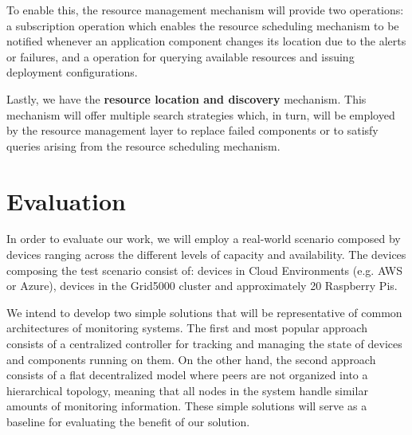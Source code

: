 
To enable this, the resource management mechanism will provide two operations: a subscription operation which enables the resource scheduling mechanism to be notified whenever an application component changes its location due to the alerts or failures, and a operation for querying available resources and issuing deployment configurations. 

Lastly, we have the \textbf{resource location and discovery} mechanism. This mechanism will offer multiple search strategies which, in turn, will be employed by the resource management layer to replace failed components or to satisfy queries arising from the resource scheduling mechanism.

\section{Evaluation}  

In order to evaluate our work, we will employ a real-world scenario composed by devices ranging across the different levels of capacity and availability. The devices composing the test scenario consist of: devices in Cloud Environments (e.g. AWS or Azure), devices in the Grid5000 cluster and approximately 20 Raspberry Pis.

We intend to develop two simple solutions 
that will be representative of common architectures of monitoring systems. The first and most popular approach consists of a centralized controller for tracking and managing the state of devices and components running on them. %
On the other hand, the second approach consists of a flat decentralized model where peers are not organized into a hierarchical topology, 
meaning that all nodes in the system handle similar amounts of monitoring information. These simple solutions will serve as a baseline for evaluating the benefit of our solution.

